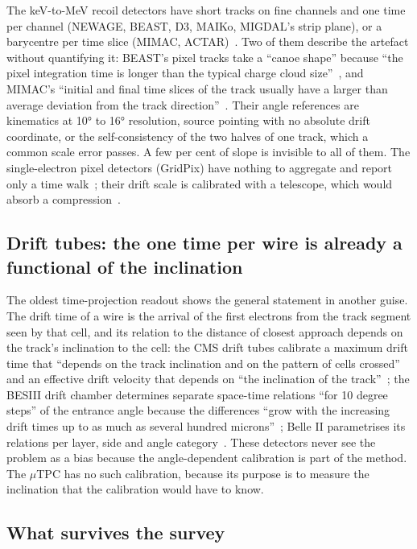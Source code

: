 The keV-to-MeV recoil detectors have short tracks on fine channels and one time per channel (NEWAGE, BEAST, D3, MAIKo,
MIGDAL's strip plane), or a barycentre per time slice (MIMAC, ACTAR)~\cite{MIMAC2020,BEAST2019,MAIKo2018,MIGDAL2023}. Two of them
describe the artefact without quantifying it: BEAST's pixel tracks take a ``canoe shape'' because ``the pixel integration time
is longer than the typical charge cloud size''~\cite{BEAST2019}, and MIMAC's ``initial and final time slices of the track
usually have a larger than average deviation from the track direction''~\cite{MIMAC2020}. Their angle references are
kinematics at \ang{10} to \ang{16} resolution, source pointing with no absolute drift coordinate, or the self-consistency of the two
halves of one track, which a common scale error passes. A few per cent of slope is invisible to all of them. The single-electron
pixel detectors (GridPix) have nothing to aggregate and report only a time walk~\cite{GridPix2018}; their drift scale is
calibrated with a telescope, which would absorb a compression~\cite{GasPix2019}.

\subsection{Drift tubes: the one time per wire is already a functional of the inclination}

The oldest time-projection readout shows the general statement in another guise. The drift time of a wire is the arrival of
the first electrons from the track segment seen by that cell, and its relation to the distance of closest approach depends on
the track's inclination to the cell: the CMS drift tubes calibrate a maximum drift time that ``depends on the track inclination
and on the pattern of cells crossed'' and an effective drift velocity that depends on ``the inclination of the
track''~\cite{CMSDT2010}; the BESIII drift chamber determines separate space-time relations ``for 10 degree steps'' of the entrance
angle because the differences ``grow with the increasing drift times up to as much as several hundred microns''~\cite{BESIIIMDC2014};
Belle II parametrises its relations per layer, side and angle category~\cite{BelleIICDC2019}. These detectors never see the
problem as a bias because the angle-dependent calibration is part of the method. The $\mu$TPC has no such calibration, because
its purpose is to measure the inclination that the calibration would have to know.

\subsection{What survives the survey}

